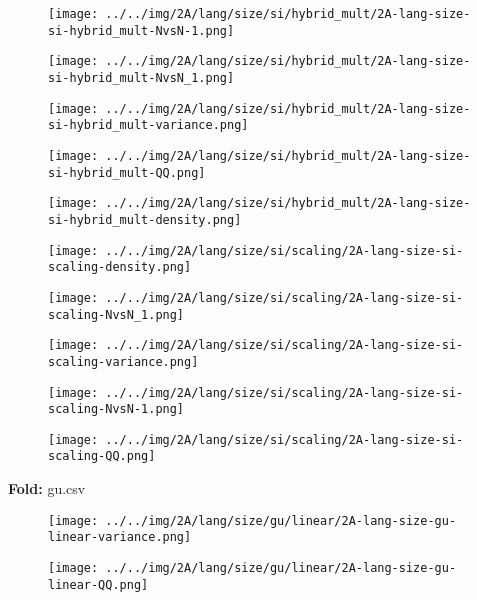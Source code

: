 \begin{figure}[H]
\centering	\texttt{[image: ../../img/2A/lang/size/si/hybrid\_mult/2A-lang-size-si-hybrid\_mult-NvsN-1.png]}
\end{figure}
\begin{figure}[H]
\centering	\texttt{[image: ../../img/2A/lang/size/si/hybrid\_mult/2A-lang-size-si-hybrid\_mult-NvsN\_1.png]}
\end{figure}
\begin{figure}[H]
\centering	\texttt{[image: ../../img/2A/lang/size/si/hybrid\_mult/2A-lang-size-si-hybrid\_mult-variance.png]}
\end{figure}
\begin{figure}[H]
\centering	\texttt{[image: ../../img/2A/lang/size/si/hybrid\_mult/2A-lang-size-si-hybrid\_mult-QQ.png]}
\end{figure}
\begin{figure}[H]
\centering	\texttt{[image: ../../img/2A/lang/size/si/hybrid\_mult/2A-lang-size-si-hybrid\_mult-density.png]}
\end{figure}
\begin{figure}[H]
\centering	\texttt{[image: ../../img/2A/lang/size/si/scaling/2A-lang-size-si-scaling-density.png]}
\end{figure}
\begin{figure}[H]
\centering	\texttt{[image: ../../img/2A/lang/size/si/scaling/2A-lang-size-si-scaling-NvsN\_1.png]}
\end{figure}
\begin{figure}[H]
\centering	\texttt{[image: ../../img/2A/lang/size/si/scaling/2A-lang-size-si-scaling-variance.png]}
\end{figure}
\begin{figure}[H]
\centering	\texttt{[image: ../../img/2A/lang/size/si/scaling/2A-lang-size-si-scaling-NvsN-1.png]}
\end{figure}
\begin{figure}[H]
\centering	\texttt{[image: ../../img/2A/lang/size/si/scaling/2A-lang-size-si-scaling-QQ.png]}
\end{figure}
\textbf{Fold:} gu.csv
\begin{figure}[H]
\centering	\texttt{[image: ../../img/2A/lang/size/gu/linear/2A-lang-size-gu-linear-variance.png]}
\end{figure}
\begin{figure}[H]
\centering	\texttt{[image: ../../img/2A/lang/size/gu/linear/2A-lang-size-gu-linear-QQ.png]}
\end{figure}
